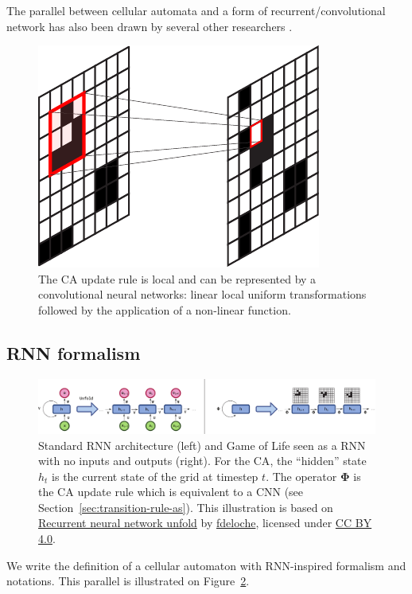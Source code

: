 The parallel between cellular automata and a form of recurrent/convolutional
network has also been drawn by several other researchers
\parencite{wulffLearningCellularAutomaton1993,
  gilpinCellularAutomataConvolutional2018,
  mordvintsevGrowingNeuralCellular2020}.

\begin{figure}[htbp]
  \centering
  \includegraphics[width=.3\linewidth]{figures/ca_cnn}
  \caption{\label{fig:ca_cnn}The CA update rule is local and can be represented
    by a convolutional neural networks: linear local uniform transformations
    followed by the application of a non-linear function.}
\end{figure}

\subsection{RNN formalism}

\begin{figure}[!ht]
  \centering
  \includegraphics[width=\linewidth]{figures/rnn_and_gol.pdf}
  \caption{\label{fig:standard_rnn} Standard RNN architecture (left) and Game of
    Life seen as a RNN with no inputs and outputs (right). For the \ac{CA}, the
    ``hidden'' state $h_t$ is the current state of the grid at timestep $t$. The
    operator $\boldsymbol{\Phi}$ is the \ac{CA} update rule which is
    equivalent to a \ac{CNN} (see Section~\ref{sec:transition-rule-as}). This
    illustration is based on
    \href{https://commons.wikimedia.org/wiki/File:Recurrent_neural_network_unfold.svg}{Recurrent
      neural network unfold} by
    \href{https://commons.wikimedia.org/wiki/User:Ixnay}{fdeloche}, licensed
    under \href{https://creativecommons.org/licenses/by-sa/4.0/}{CC BY 4.0}.}
\end{figure}


We write the definition of a cellular automaton with RNN-inspired formalism and
notations. This parallel is illustrated on Figure~\ref{fig:standard_rnn}.

